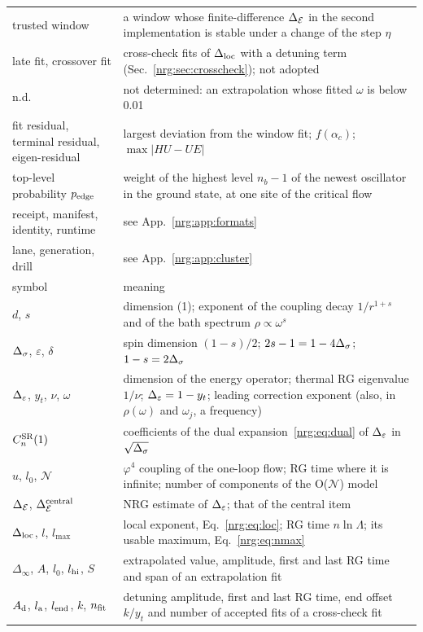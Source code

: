 \begin{longtable}{@{}>{\raggedright\arraybackslash}p{3.4cm}p{12.2cm}@{}}
trusted window & a window whose finite-difference $\Delta_{\mathcal E}$ in the second implementation is stable under a change of the step $\eta$\\
late fit, crossover fit & cross-check fits of $\Delta_{\rm loc}$ with a detuning term (Sec.~\ref{nrg:sec:crosscheck}); not adopted\\
n.d. & not determined: an extrapolation whose fitted $\omega$ is below 0.01\\
fit residual, terminal residual, eigen-residual & largest deviation from the window fit; $f(\alpha_c)$; $\max|HU-UE|$\\
top-level probability $p_{\rm edge}$ & weight of the highest level $n_b-1$ of the newest oscillator in the ground state, at one site of the critical flow\\
receipt, manifest, identity, runtime & see App.~\ref{nrg:app:formats}\\
lane, generation, drill & see App.~\ref{nrg:app:cluster}\\
\midrule
symbol & meaning\\\midrule
$d$, $s$ & dimension (1); exponent of the coupling decay $1/r^{1+s}$ and of the bath spectrum $\rho\propto\omega^s$\\
$\Delta_\sigma$, $\varepsilon$, $\delta$ & spin dimension $(1-s)/2$; $2s-1=1-4\Delta_\sigma$; $1-s=2\Delta_\sigma$\\
$\Delta_\varepsilon$, $y_t$, $\nu$, $\omega$ & dimension of the energy operator; thermal RG eigenvalue $1/\nu$; $\Delta_\varepsilon=1-y_t$; leading correction exponent (also, in $\rho(\omega)$ and $\omega_j$, a frequency)\\
$C^{\rm SR}_n(1)$ & coefficients of the dual expansion~\eqref{nrg:eq:dual} of $\Delta_\varepsilon$ in $\sqrt{\Delta_\sigma}$\\
$u$, $l_0$, $\mathcal N$ & $\varphi^4$ coupling of the one-loop flow; RG time where it is infinite; number of components of the O($\mathcal N$) model\\
$\Delta_{\mathcal E}$, $\Delta_{\mathcal E}^{\rm central}$ & NRG estimate of $\Delta_\varepsilon$; that of the central item\\
$\Delta_{\rm loc}$, $l$, $l_{\max}$ & local exponent, Eq.~\eqref{nrg:eq:loc}; RG time $n\ln\Lambda$; its usable maximum, Eq.~\eqref{nrg:eq:nmax}\\
$\Delta_\infty$, $A$, $l_0$, $l_{\rm hi}$, $S$ & extrapolated value, amplitude, first and last RG time and span of an extrapolation fit\\
$A_{\rm d}$, $l_{\rm a}$, $l_{\rm end}$, $k$, $n_{\rm fit}$ & detuning amplitude, first and last RG time, end offset $k/y_t$ and number of accepted fits of a cross-check fit\\

\end{longtable}
